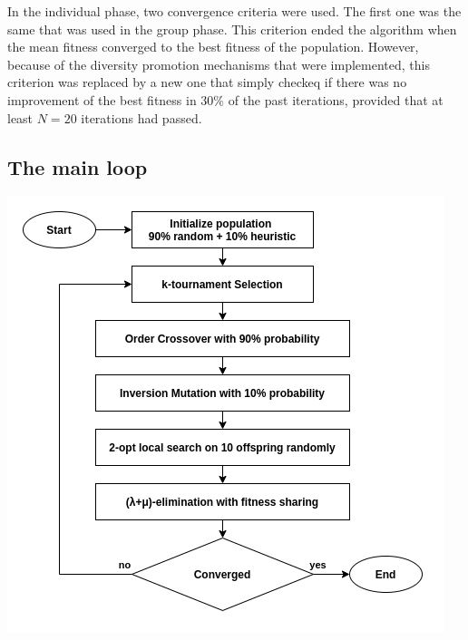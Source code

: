 \documentclass[a4paper,10pt]{article}
\newcommand{\ReplaceMe}[1]{{\color{blue}#1}}
\begin{document}
In the individual phase, two convergence criteria were used. The first one was the same that was used in the group phase. This criterion ended the algorithm when the mean fitness converged to the best fitness of the population. However, because of the diversity promotion mechanisms that were implemented, this criterion was replaced by a new one that simply checkeq if there was no improvement of the best fitness in $30\%$ of the past iterations, provided that at least $N=20$ iterations had passed.

\subsection{The main loop}


\begin{center}
\includegraphics[scale=0.7]{images/genetic_algorthm_main_loop.png} 
\end{center}
\end{document}
